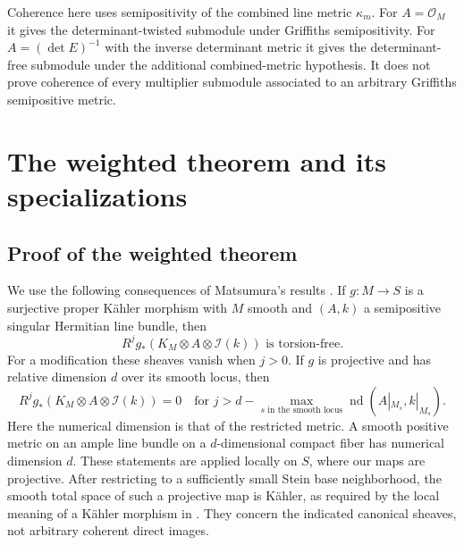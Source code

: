 \documentclass[11pt,reqno]{amsart}
\numberwithin{equation}{section}
\theoremstyle{definition}
\theoremstyle{remark}
\newcommand{\OO}{\mathcal O}
\newcommand{\II}{\mathcal I}
\newcommand{\nd}{\operatorname{nd}}
\begin{document}
Coherence here uses semipositivity of the combined line metric $\kappa_m$. For $A=\OO_M$ it gives the determinant-twisted submodule under Griffiths semipositivity. For $A=(\det E)^{-1}$ with the inverse determinant metric it gives the determinant-free submodule under the additional combined-metric hypothesis. It does not prove coherence of every multiplier submodule associated to an arbitrary Griffiths semipositive metric.

\section{The weighted theorem and its specializations}\label{sec:proof}\label{sec:recovery}
\subsection{Proof of the weighted theorem}
We use the following consequences of Matsumura's results \cite[Corollary 1.5 and Theorem 1.7]{Matsumura}. If $g:M\to S$ is a surjective proper K\"ahler morphism with $M$ smooth and $(A,k)$ a semipositive singular Hermitian line bundle, then
\begin{equation}\label{eq:mat-tf}
 R^jg_*(K_M\otimes A\otimes\II(k))
 \text{ is torsion-free.}
\end{equation}
For a modification these sheaves vanish when $j>0$. If $g$ is projective and has relative dimension $d$ over its smooth locus, then
\begin{equation}\label{eq:mat-nd}
 R^jg_*(K_M\otimes A\otimes\II(k))=0
 \quad\text{for }j>d-\max_{s\text{ in the smooth locus}}\nd(A|_{M_s},k|_{M_s}).
\end{equation}
Here the numerical dimension is that of the restricted metric. A smooth positive metric on an ample line bundle on a $d$-dimensional compact fiber has numerical dimension $d$. These statements are applied locally on $S$, where our maps are projective. After restricting to a sufficiently small Stein base neighborhood, the smooth total space of such a projective map is K\"ahler, as required by the local meaning of a K\"ahler morphism in \cite[Remark 1.4]{Matsumura}. They concern the indicated canonical sheaves, not arbitrary coherent direct images.
\end{document}
